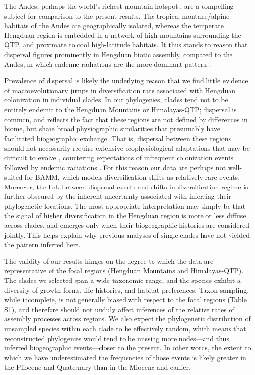 \documentclass[9pt,twocolumn,twoside,lineno]{pnas-new}
\begin{document}
The Andes, perhaps the world's richest mountain hotspot
\citep{hughes2016}, are a compelling subject for comparison to the
present results. The tropical montane/alpine habitats of the Andes are
geographically isolated, whereas the temperate Hengduan region is
embedded in a network of high mountains surrounding the QTP, and
proximate to cool high-latitude habitats. It thus stands to reason
that dispersal figures prominently in Hengduan biotic assembly,
compared to the Andes, in which endemic radiations are the more
dominant pattern
\citep[e.g.,][]{pennington2010,Lagomarsino2016,Hughes2015,Luebert2014,Hughes2006}.

Prevalence of dispersal is likely the underlying reason that we find
little evidence of macroevolutionary jumps in diversification rate
associated with Hengduan colonization in individual clades. In our
phylogenies, clades tend not to be entirely endemic to the Hengduan
Mountains or Himalayas-QTP; dispersal is common, and reflects the fact
that these regions are not defined by differences in biome, but share
broad physiographic similarities that presumably have facilitated
biogeographic exchange. That is, dispersal between these regions
should not necessarily require extensive ecophysiological adaptations
that may be difficult to evolve \citep{Donoghue2014}, countering
expectations of infrequent colonization events followed by endemic
radiations \citep[cf.][]{Hughes2006}. For this reason our data are
perhaps not well-suited for BAMM, which models diversification shifts
as relatively rare events. Moreover, the link between dispersal events
and shifts in diversification regime is further obscured by the
inherent uncertainty associated with inferring their phylogenetic
locations. The most appropriate interpretation may simply be that the
signal of higher diversification in the Hengduan region is more or
less diffuse across clades, and emerges only when their biogeographic
histories are considered jointly. This helps explain why previous
analyses of single clades have not yielded the pattern inferred here.

The validity of our results hinges on the degree to which the data are
representative of the focal regions (Hengduan Mountains and
Himalayas-QTP). The clades we selected span a wide taxonomic range,
and the species exhibit a diversity of growth forms, life histories,
and habitat preferences. Taxon sampling, while incomplete, is not
generally biased with respect to the focal regions (Table S1), and
therefore should not unduly affect inferences of the relative rates of
assembly processes across regions. We also expect the phylogenetic
distribution of unsampled species within each clade to be effectively
random, which means that reconstructed phylogenies would tend to be
missing more nodes---and thus inferred biogeographic events---closer
to the present. In other words, the extent to which we have
underestimated the frequencies of those events is likely greater in
the Pliocene and Quaternary than in the Miocene and earlier.
\end{document}
